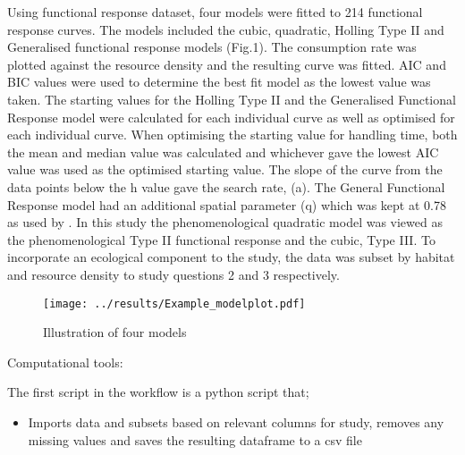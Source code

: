 \documentclass[11pt]{article}
\begin{document}
Using \cite{Pawar2012} functional response dataset, four models were fitted to 214 functional response curves. The models included the cubic, quadratic, Holling Type II and Generalised functional response models (Fig.1). The consumption rate was plotted against the resource density and the resulting curve was fitted. AIC and BIC values were used to determine the best fit model as the lowest value was taken.
The starting values for the Holling Type II and the Generalised Functional Response model were calculated for each individual curve as well as optimised for each individual curve. When optimising the starting value for handling time, both the mean and median value was calculated and whichever gave the lowest AIC value was used as the optimised starting value. The slope of the curve from the data points below the h value gave the search rate, (a). The General Functional Response model had an additional spatial parameter (q) which was kept at 0.78 as used by \cite{Pawar2012}. In this study the phenomenological quadratic model was viewed as the phenomenological Type II functional response and the cubic, Type III. 
To incorporate an ecological component to the study, the data was subset by habitat and resource density to study questions 2 and 3 respectively. 

\begin{figure}[h!]
	\centering 
	\texttt{[image: ../results/Example\_modelplot.pdf]}
	\caption{Illustration of four models}
	\label{Four models plotted}
\end{figure}



Computational tools: 



The first script in the workflow is a python script that;
	\begin{itemize}
	\item Imports data and subsets based on relevant columns for study, removes any missing values and saves the resulting dataframe to a csv file 
	\end{itemize}
\end{document}
